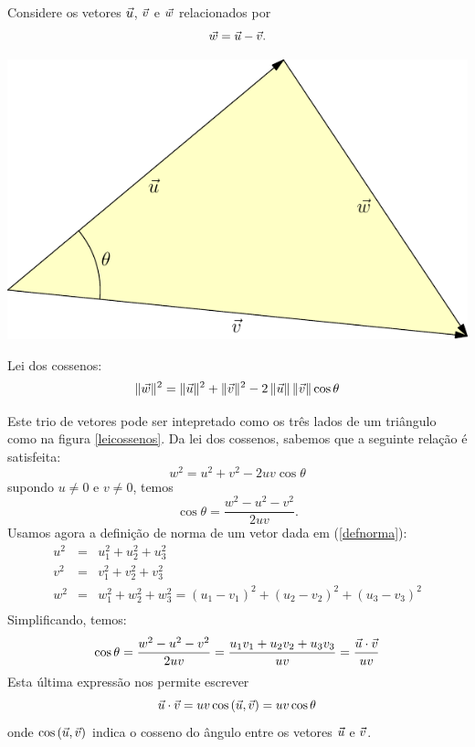 Considere os vetores $\vec{u}$, $\vec{v}$ e $\vec{w}$ relacionados por $$\vec{w}=\vec{u}-\vec{v}.$$
\begin{marginfigure}
        \includegraphics[width=\textwidth]{./cap_algvet/pics/cossenos} %
    \caption{Lei dos cossenos: $$\|\vec{w}\|^2=\|\vec{u}\|^2+\|\vec{v}\|^2-2~\!\|\vec{u}\|~\!\|\vec{v}\|\cos\theta$$}\label{leicossenos}
\end{marginfigure}
Este trio de vetores pode ser intepretado como os três lados de um triângulo como na figura \ref{leicossenos}. Da lei dos cossenos, sabemos que a seguinte relação é satisfeita:
 $$w^2=u^2+v^2-2uv\cos\theta$$
supondo $u\neq 0$ e $v\neq 0$, temos
$$\cos\theta = \frac{w^2-u^2-v^2}{2uv}.$$
Usamos agora a definição de norma de um vetor dada em (\ref{defnorma}):
\begin{eqnarray*}
u^2&=&u_1^2+u_2^2+u_3^2\\
v^2&=&v_1^2+v_2^2+v_3^2\\
w^2&=&w_1^2+w_2^2+w_3^2=\left(u_1-v_1\right)^2+\left(u_2-v_2\right)^2+\left(u_3-v_3\right)^2\\
\end{eqnarray*}
Simplificando, temos:
$$\cos\theta = \frac{w^2-u^2-v^2}{2uv}=\frac{u_1v_1+u_2v_2+u_3v_3}{uv}=\frac{\vec{u}\cdot\vec{v}}{uv}$$
Esta última expressão nos permite escrever
\begin{equation}\label{defintriprodesc}
\vec{u}\cdot\vec{v}=uv\cos\left(\vec{u},\vec{v}\right)=uv\cos\theta
\end{equation}
onde $\cos\left(\vec{u},\vec{v}\right)$ indica o cosseno do ângulo entre os vetores $\vec{u}$ e $\vec{v}$.



